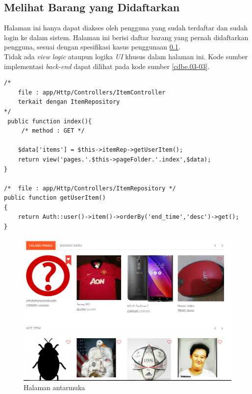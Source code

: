 \subsection{Melihat Barang yang Didaftarkan}
Halaman ini hanya dapat diakses oleh pengguna yang sudah terdaftar dan sudah login ke dalam sistem. Halaman ini berisi daftar barang yang pernah didaftarkan pengguna, sesuai dengan spesifikasi kasus penggunaan \ref{}.\\
\indent Tidak ada \textit{view logic} ataupun logika \textit{UI} khusus dalam halaman ini. Kode sumber implementasi \textit{back-end} dapat dilihat pada kode sumber \ref{cdbe.03-03}.

\begin{lstlisting}[label=cdbe.03-03,style=php,caption=Kode Sumber \textit{Back-end} Melihat Barang yang Pernah Didaftarkan]
/*	
	file : app/Http/Controllers/ItemController
	terkait dengan ItemRepository
*/
 public function index(){
	 /*	method : GET */
	
    $data['items'] = $this->itemRep->getUserItem();
    return view('pages.'.$this->pageFolder.'.index',$data);
}

/*	file : app/Http/Controllers/ItemRepository */
public function getUserItem()
{
    return Auth::user()->item()->orderBy('end_time','desc')->get();
}
\end{lstlisting}

\begin{figure}[H]
	\centering
	\includegraphics[width=\textwidth]{images/bab4/ui/02-01.png}
	\caption{Halaman antarmuka }
	\label{ui.02-01}
\end{figure}

